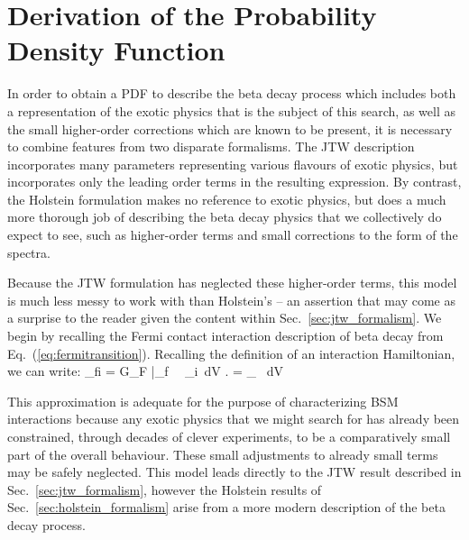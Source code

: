 %
%
%
\chapter[Derivation of the Beta Decay Probability Density Function]{Derivation of the Probability Density Function}
\label{appendix_forthepeople}
In order to obtain a \acf{PDF} to describe the beta decay process which includes both a representation of the exotic physics that is the subject of this search, as well as the small higher-order corrections which are known to be present, it is necessary to combine features from two disparate formalisms.  The \acf{JTW} description incorporates many parameters representing various flavours of exotic physics, but incorporates only the leading order terms in the resulting expression.  By contrast, the Holstein formulation makes no reference to exotic physics, but does a much more thorough job of describing the beta decay physics that we collectively do expect to see, such as higher-order terms and small corrections to the form of the spectra.


Because the \ac{JTW} formulation has neglected these higher-order terms, this model is much less messy to work with than Holstein's -- an assertion that may come as a surprise to the reader given the content within Sec.~\ref{sec:jtw_formalism}.
We begin by recalling the Fermi contact interaction description of beta decay from Eq.~(\ref{eq:fermitransition}).  Recalling the definition of an interaction Hamiltonian, we can write:
\bea
{}_{fi} \;\;=\;\; G_F \int \bar{\psi}_f \,  \, \psi_i \,\textrm{d}V .
\;\;=\;\;
\int \! _{} \, \textrm{d}V
\label{eq:transitionmatrixhamiltonian}
\eea 

This approximation is adequate for the purpose of characterizing \ac{BSM} interactions because any exotic physics that we might search for has already been constrained, through decades of clever experiments, to be a comparatively small part of the overall behaviour.  These small adjustments to already small terms may be safely neglected.  This model leads directly to the \ac{JTW} result described in Sec.~\ref{sec:jtw_formalism}, however the Holstein results of Sec.~\ref{sec:holstein_formalism} arise from a more modern description of the beta decay process.  

